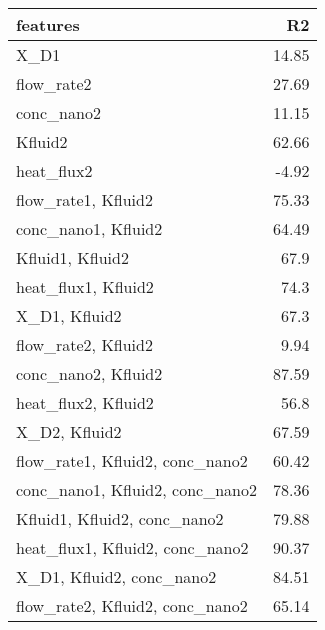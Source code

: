 
    \begin{table*}
        \centering
        \begin{tabular}{lr}
\hline
 features                                                             &    R2 \\
\hline
 X\_D1                                                                & 14.85 \\
 flow\_rate2                                                          & 27.69 \\
 conc\_nano2                                                          & 11.15 \\
 Kfluid2                                                              & 62.66 \\
 heat\_flux2                                                          & -4.92 \\
 flow\_rate1, Kfluid2                                                 & 75.33 \\
 conc\_nano1, Kfluid2                                                 & 64.49 \\
 Kfluid1, Kfluid2                                                     & 67.9  \\
 heat\_flux1, Kfluid2                                                 & 74.3  \\
 X\_D1, Kfluid2                                                       & 67.3  \\
 flow\_rate2, Kfluid2                                                 &  9.94 \\
 conc\_nano2, Kfluid2                                                 & 87.59 \\
 heat\_flux2, Kfluid2                                                 & 56.8  \\
 X\_D2, Kfluid2                                                       & 67.59 \\
 flow\_rate1, Kfluid2, conc\_nano2                                    & 60.42 \\
 conc\_nano1, Kfluid2, conc\_nano2                                    & 78.36 \\
 Kfluid1, Kfluid2, conc\_nano2                                        & 79.88 \\
 heat\_flux1, Kfluid2, conc\_nano2                                    & 90.37 \\
 X\_D1, Kfluid2, conc\_nano2                                          & 84.51 \\
 flow\_rate2, Kfluid2, conc\_nano2                                    & 65.14 \\

\end{tabular}
\end{table*}
